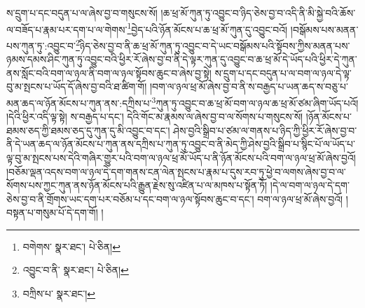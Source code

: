 ས་དྲུག་པ་དང་བདུན་པ་ལ་ཞེས་བྱ་བ་གསུངས་སོ། །ཆ་ཕྲ་མོ་ཀུན་ཏུ་འབྱུང་བ་ཉིད་ཅེས་བྱ་བ་འདི་ནི་མི་སྐྱེ་བའི་ཆོས་ལ་བཟོད་པ་རྣམ་པར་དག་པ་ལ་གེགས་\footnote{བགེགས་  སྣར་ཐང་།  པེ་ཅིན། }བྱེད་པའི་ཉོན་མོངས་པ་ཆ་ཕྲ་མོ་ཀུན་དུ་འབྱུང་བའོ། །བསྒོམས་པས་མནན་པས་ཀུན་ཏུ་:འབྱུང་བ་\footnote{འབྱུང་བ་ནི་  སྣར་ཐང་།  པེ་ཅིན། }ཉིད་ཅེས་བྱ་བ་ནི་ཆ་ཕྲ་མོ་ཀུན་ཏུ་འབྱུང་བ་དེ་ཡང་བསྒོམས་པའི་སྟོབས་ཀྱིས་མནན་པས་ཉམས་དམས་ཤིང་ཀུན་ཏུ་འབྱུང་བའི་ཕྱིར་རོ་ཞེས་བྱ་བ་ནི་དེ་ལྟར་ཀུན་དུ་འབྱུང་བ་ཆ་ཕྲ་མོ་དེ་ཡོད་པའི་ཕྱིར་དེ་ཀུན་ནས་སློང་བའི་བག་ལ་ཉལ་ནི་བག་ལ་ཉལ་སྟོབས་ཆུང་བ་ཞེས་བྱ་སྟེ། ས་དྲུག་པ་དང་བདུན་པ་ལ་བག་ལ་ཉལ་དེ་ལྟ་བུ་མ་སྤངས་པ་ཡོད་དོ་ཞེས་བྱ་བའི་ཐ་ཚིག་གོ། །བག་ལ་ཉལ་ཕྲ་མོ་ཞེས་བྱ་བ་ནི་ས་བརྒྱད་པ་ཡན་ཆད་ས་བཅུ་པ་མན་ཆད་ལ་ཉོན་མོངས་པ་ཀུན་ནས་:དཀྲིས་པ་\footnote{བཀྲིས་པ་  སྣར་ཐང་། }ཀུན་ཏུ་འབྱུང་བ་ཆ་ཕྲ་མོ་བག་ལ་ཉལ་ཆ་ཕྲ་མོ་ཙམ་ཞིག་ཡོད་པའོ། །དེའི་ཕྱིར་འདི་ལྟ་སྟེ། ས་བརྒྱད་པ་དང་། དེའི་གོང་མ་རྣམས་ལ་ཞེས་བྱ་བ་ལ་སོགས་པ་གསུངས་སོ། །ཉོན་མོངས་པ་ཐམས་ཅད་ཀྱི་ཐམས་ཅད་དུ་ཀུན་དུ་མི་འབྱུང་བ་དང་། ཤེས་བྱའི་སྒྲིབ་པ་ཙམ་ལ་གནས་པ་ཉིད་ཀྱི་ཕྱིར་རོ་ཞེས་བྱ་བ་ནི་དེ་ཡན་ཆད་ལ་ཉོན་མོངས་པ་ཀུན་ནས་དཀྲིས་པ་ཀུན་ཏུ་འབྱུང་བ་ནི་མེད་ཀྱི་ཤེས་བྱའི་སྒྲིབ་པ་སྙིང་པོ་ལ་ཡོད་པ་ལྟ་བུ་མ་སྤངས་པས་དེའི་གཞིར་གྱུར་པའི་བག་ལ་ཉལ་ཕྲ་མོ་ཡོད་པ་ནི་ཉོན་མོངས་པའི་བག་ལ་ཉལ་ཕྲ་མོ་ཞེས་བྱའོ། །བཅོམ་ལྡན་འདས་བག་ལ་ཉལ་དེ་དག་གནས་ངན་ལེན་སྤངས་པ་རྣམ་པ་དུས་རབ་ཏུ་ཕྱེ་བ་ལགས་ཞེས་བྱ་བ་ལ་སོགས་པས་ཀྱང་ཀུན་ནས་ཉོན་མོངས་པའི་རྒྱུན་རྗེས་སུ་འཛིན་པ་ལ་མཁས་པ་སྟོན་ཏོ། །དེ་ལ་བག་ལ་ཉལ་དེ་དག་ཅེས་བྱ་བ་ནི་གྲོགས་ཡང་དག་པར་བཅོམ་པ་དང་བག་ལ་ཉལ་སྟོབས་ཆུང་བ་དང་། བག་ལ་ཉལ་ཕྲ་མོ་ཞེས་བྱའོ། །བསྟན་པ་གསུམ་པོ་དེ་དག་གོ། །
